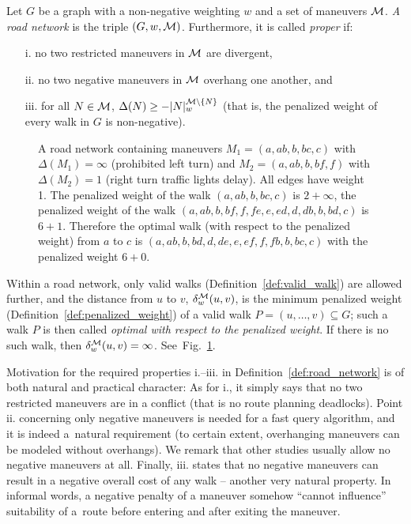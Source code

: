 \documentclass[envcountsect,envcountsame]{llncs}
\begin{document}
\begin{definition}
\label{def:road_network}
Let $G$ be a graph with a non-negative weighting $w$ and a set of maneuvers 
$\cal M$. \emph{A road network} is the triple $(G,w,{\cal M})$. 
Furthermore, it is called \emph{proper} if:
\begin{itemize}
\parskip 2pt
\item[i.] no two restricted maneuvers in $\cal M$ are divergent,
\item[ii.] no two negative maneuvers in $\cal M$ overhang one another, and
\item[iii.] for all $N \in {\cal{M}}$, $\Delta(N) \geq -|N|_w^{{\cal{M}} 
    \setminus \{N\}}$ (that is, the penalized weight of every walk in $G$ is 
  non-negative). \end{itemize}
\vspace{-4pt}
\end{definition}

\begin{figure}[t]
  \centering
  \centerline{}
  \vspace*{-.5ex}
  \caption{A road network containing maneuvers $M_1=(a,ab,b,bc,c)$ 
    with $\Delta(M_1)=\infty$ (prohibited left turn) and $M_2=(a,ab,b,bf,f)$ 
    with $\Delta(M_2) = 1$ (right turn traffic lights delay). All edges
    have weight 1. The penalized weight of the walk $(a,ab,b,bc,c)$ is $2 + 
    \infty$, the penalized weight of the walk $(a,ab,b,bf,f,fe,e,ed,d,db,b,bd,
    c)$ is $6 + 1$. Therefore the optimal walk (with respect to the 
    penalized weight) from $a$ to $c$ is $(a,ab,b,bd,d,de,e,ef,f,fb,b,bc,c)$ 
    with the penalized weight $6 + 0$.}
  \label{fig:maneuver}
\end{figure}

Within a road network, only valid walks (Definition~\ref{def:valid_walk})
are allowed further, and the distance from $u$ to $v$, $\delta_w^{\cal{M}}
(u,v)$, is the minimum penalized weight (Definition~\ref{def:penalized_weight})
of a valid walk $P=(u, \ldots, v) \subseteq G$; such a walk $P$ is then 
called \emph{optimal with respect to the penalized weight}. If there is no 
such walk, then $\delta_w^{\cal{M}}(u,v) = \infty$. See~Fig.~\ref{fig:maneuver}.

Motivation for the required properties i.--iii. in 
Definition~\ref{def:road_network} is of both natural and practical character:
As for i., it simply says that no two restricted maneuvers are in a
conflict (that is no route planning deadlocks). Point ii. concerning only 
negative maneuvers is needed for a fast query algorithm, and it is indeed 
a~natural requirement (to certain extent, overhanging maneuvers can be modeled 
without overhangs). We remark that other studies usually allow no negative 
maneuvers at all. Finally, iii. states that no negative maneuvers can result 
in a negative overall cost of any walk -- another very natural property.
In informal words, a negative penalty of a maneuver somehow ``cannot 
influence'' suitability of a~route before entering and after exiting the 
maneuver.
\end{document}
